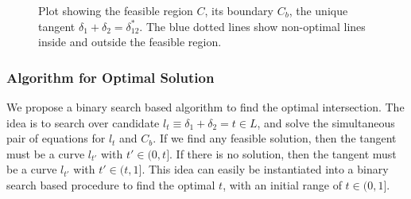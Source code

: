\begin{figure}
    \caption{Plot showing the feasible region $C$, its boundary $C_b$, the unique tangent $\delta_1 + \delta_2 = \delta_{12}^*$. The blue dotted lines show non-optimal lines inside and outside the feasible region.}
    \label{fig:optimization-demo}
\end{figure}

\subsubsection{Algorithm for Optimal Solution}
We propose a binary search based algorithm to find the optimal intersection. 
The idea is to search over candidate $l_t \equiv \delta_1 + \delta_2 = t \in L$, and solve the simultaneous pair of equations for $l_t$ and $C_b$. 
If we find any feasible solution, then the tangent must be a curve $l_{t'}$  with $t' \in (0, t]$.
If there is no solution, then the tangent must be a curve $l_{t'}$ with $t' \in (t, 1]$.
This idea can easily be instantiated into a binary search based procedure to find the optimal $t$, with an initial range of $t\in (0, 1]$. 

